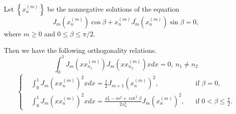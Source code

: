 \begin{proposition}[]
Let $\left\{x_n^{(m)}\right\}$ be the nonnegative solutions of the equation
\begin{equation}\label{eq.Bessel_roots}
    J_m\left(x_n^{(m)}\right) \cos \beta+x_n^{(m)} J_m^{\prime}\left(x_n^{(m)}\right) \sin \beta=0,
\end{equation}
where $m \geq 0$ and $0 \leq \beta \leq \pi / 2$.

Then we have the following orthogonality relations.
\begin{equation}\label{eq.Bessel_orthogonality_1}
    \int_0^1 J_m\left(x x_{n_1}^{(m)}\right) J_m\left(x x_{n_2}^{(m)}\right) x d x=0,\ n_1 \neq n_2
\end{equation}
\begin{equation}\label{eq.Bessel_orthogonality_2}
    \left\{\begin{aligned}
    &\int_0^1 J_m\left(x x_n^{(m)}\right)^2 x d x=\frac{1}{2} J_{m+1}\left(x_n^{(m)}\right)^2, && \text {if } \beta=0, 
    \\
    &\int_0^1 J_m\left(x x_n^{(m)}\right)^2 x d x=\frac{x_n^2-m^2+\cot ^2 \beta}{2 x_n^2} J_m\left(x_n^{(m)}\right)^2, && \text{if } 0<\beta \leq \frac{\pi}{2} .
    \end{aligned}\right.
\end{equation}
\end{proposition}
